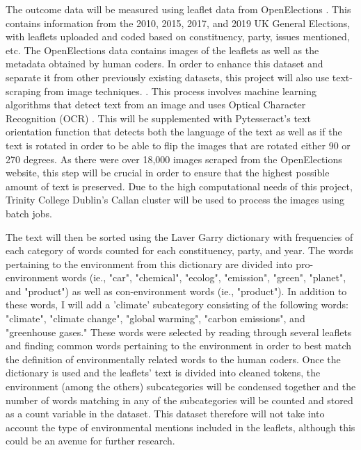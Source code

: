 \documentclass[12pt,letterpaper]{article}
\begin{document}
The outcome data will be measured using leaflet data from OpenElections \autocite{milazzo2020openelections}. This contains information from the 2010, 2015, 2017, and 2019 UK General Elections, with leaflets uploaded and coded based on constituency, party, issues mentioned, etc. The OpenElections data contains images of the leaflets as well as the metadata obtained by human coders. In order to enhance this dataset and separate it from other previously existing datasets, this project will also use text-scraping from image techniques. \autocite{KerasocrKeras_ocrDocumentation,hoffstaetterPytesseractPythontesseractPython}. This process involves machine learning algorithms that detect text from an image and uses Optical Character Recognition (OCR) \autocite{madhugiriExtractTextImages2022}. This will be supplemented with Pytesseract's text orientation function that detects both the language of the text as well as if the text is rotated \autocite{rosebrockCorrectingTextOrientation2022} in order to be able to flip the images that are rotated either 90 or 270 degrees. As there were over 18,000 images scraped from the OpenElections website, this step will be crucial in order to ensure that the highest possible amount of text is preserved. Due to the high computational needs of this project, Trinity College Dublin's Callan cluster will be used to process the images using batch jobs.



The text will then be sorted using the Laver Garry dictionary \autocite{laverEstimatingPolicyPositions2000} with frequencies of each category of words counted for each constituency, party, and year. The words pertaining to the environment from this dictionary are divided into pro-environment words (ie., "car", "chemical", "ecolog", "emission", "green", "planet", and "product") as well as con-environment words (ie., "product"). In addition to these words, I will add a 'climate' subcategory consisting of the following words: "climate", "climate change", "global warming", "carbon emissions", and "greenhouse gases." These words were selected by reading through several leaflets and finding common words pertaining to the environment in order to best match the definition of environmentally related words to the human coders. Once the dictionary is used and the leaflets' text is divided into cleaned tokens, the environment (among the others) subcategories will be condensed together and the number of words matching in any of the subcategories will be counted and stored as a count variable in the dataset. This dataset therefore will not take into account the type of environmental mentions included in the leaflets, although this could be an avenue for further research. 
\end{document}
